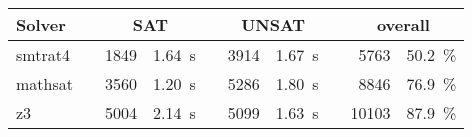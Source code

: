 \begin{table}[]
    \begin{tabularx}{\textwidth}{lXrrXrrXrr}
    	\toprule
    	\textbf{Solver}
    	&& \multicolumn{2}{c}{\textbf{SAT}}
    	&& \multicolumn{2}{c}{\textbf{UNSAT}}
    	&& \multicolumn{2}{c}{\textbf{overall}}
    	\\
    	\midrule
    	smtrat4
    	&& 1849 & 1.64~s
    	&& 3914 & 1.67~s
    	&& 5763 & 50.2~\%
    	\\
    	mathsat
    	&& 3560 & 1.20~s
    	&& 5286 & 1.80~s
    	&& 8846 & 76.9~\%
    	\\
    	z3
    	&& 5004 & 2.14~s
    	&& 5099 & 1.63~s
    	&& 10103 & 87.9~\%
    	\\
    	\bottomrule
    \end{tabularx}
\end{table}